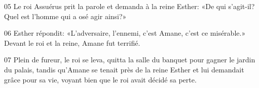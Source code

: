 
05 Le roi Assuérus prit la parole et demanda à la reine Esther: «De qui s’agit-il? Quel est l’homme qui a osé agir ainsi?»

06 Esther répondit: «L’adversaire, l’ennemi, c’est Amane, c’est ce misérable.» Devant le roi et la reine, Amane fut terrifié.

07 Plein de fureur, le roi se leva, quitta la salle du banquet pour gagner le jardin du palais, tandis qu’Amane se tenait près de la reine Esther et lui demandait grâce pour sa vie, voyant bien que le roi avait décidé sa perte.
